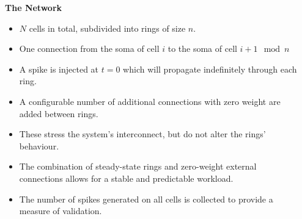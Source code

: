 \documentclass{beamer}
\begin{document}
\begin{frame}[t, fragile]
\begin{columns}[t]
\begin{column}[T]{0.45\textwidth}
    \end{column}
    \begin{column}[T]{0.25\textwidth}
      \textbf{The Network}
      \begin{itemize}
        \item $N$ cells in total, subdivided into rings of size $n$.
        \item One connection from the soma of cell $i$ to the soma of cell $i + 1 \mod n$
        \item A spike is injected at $t=0$ which will propagate indefinitely through each ring.
        \item A configurable number of additional connections with zero weight
              are added between rings.
        \item These stress the system's interconnect, but do not alter the
              rings' behaviour.
        \item The combination of steady-state rings and zero-weight external
              connections allows for a stable and predictable workload.
        \item The number of spikes generated on all cells is collected to
              provide a measure of validation.
      \end{itemize}
    \end{column}
  \end{columns}


\end{frame}
\end{document}
